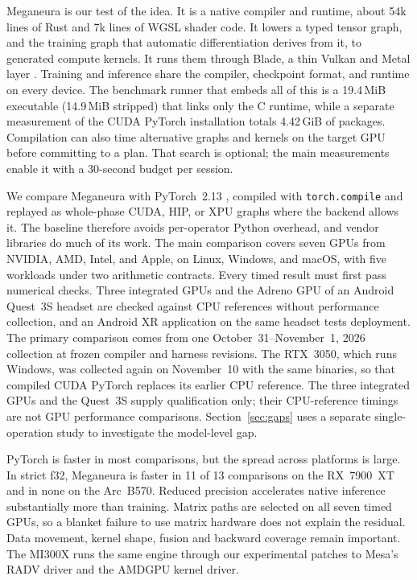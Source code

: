 \documentclass[conference]{IEEEtran}
\newcommand{\system}{Meganeura}
\newcommand{\code}[1]{\texttt{#1}}
\begin{document}
\system{} is our test of the idea. It is a native compiler and runtime,
about 54k lines of Rust and 7k lines of WGSL shader code. It lowers a typed
tensor graph, and the training graph that automatic differentiation derives
from it, to generated compute kernels. It runs them through Blade, a thin
Vulkan and Metal layer \cite{malyshau2026barriers}. Training and inference
share the compiler, checkpoint format, and runtime on every device. The
benchmark runner that embeds all of this is a 19.4\,MiB executable
(14.9\,MiB stripped) that links only the C runtime, while a separate
measurement of the CUDA PyTorch installation totals 4.42\,GiB of packages. Compilation can
also time alternative graphs and kernels on the target GPU before committing
to a plan. That search is optional; the main measurements enable it with a
30-second budget per session.

We compare \system{} with PyTorch~2.13 \cite{paszke2019pytorch}, compiled
with \code{torch.compile} and replayed as whole-phase CUDA, HIP, or XPU graphs
where the backend allows it. The baseline therefore avoids per-operator Python
overhead, and vendor libraries do much of its work. The main comparison
covers seven GPUs from NVIDIA, AMD, Intel, and Apple, on Linux, Windows, and
macOS, with five workloads under two arithmetic contracts. Every timed result
must first pass numerical checks. Three integrated GPUs and the Adreno
GPU of an Android Quest~3S headset are checked against CPU references without
performance collection, and an Android XR application on the same headset tests deployment.
The primary comparison comes from one October~31--November~1, 2026
collection at frozen compiler and harness revisions. The RTX~3050, which
runs Windows, was collected again on November~10 with the same binaries, so
that compiled CUDA PyTorch replaces its earlier CPU reference. The three
integrated GPUs and the Quest~3S supply qualification only; their CPU-reference
timings are not GPU performance comparisons. Section~\ref{sec:gaps} uses a
separate single-operation study to investigate the model-level gap.

PyTorch is faster in most comparisons, but the spread across platforms is
large. In strict f32, \system{} is faster in 11 of 13 comparisons on the
RX~7900~XT and in none on the Arc~B570. Reduced precision accelerates native
inference substantially more than training. Matrix paths are selected on
all seven timed GPUs, so a blanket failure to use matrix hardware does not
explain the residual. Data movement, kernel shape, fusion and backward
coverage remain important. The MI300X runs the same engine through our
experimental patches to Mesa's RADV driver and the AMDGPU kernel driver.
\end{document}
